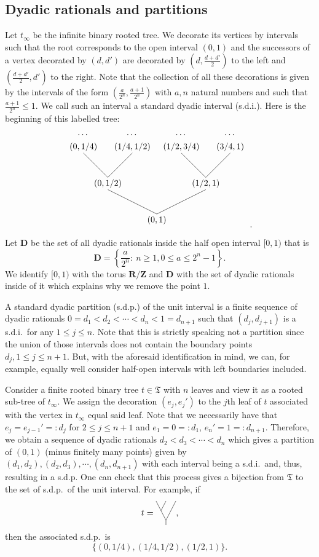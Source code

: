 \documentclass[a4paper,12pt]{amsart}
\numberwithin{equation}{section}
\theoremstyle{definition}
\newcommand{\D}{\mathbf D}
\newcommand{\R}{\mathbf{R}}
\newcommand{\fT}{\mathfrak T}
\newcommand{\Z}{\mathbf{Z}}
\begin{document}
\subsection{Dyadic rationals and partitions}\label{sec:Dyadic}
Let $t_\infty$ be the infinite binary rooted tree.
We decorate its vertices by intervals such that the root corresponds to the open interval $(0,1)$ and the successors of a vertex decorated by $(d,d')$ are decorated by $(d,\tfrac{d+d'}{2})$ to the left and $(\tfrac{d+d'}{2} , d' )$ to the right.
Note that the collection of all these decorations is given by the intervals of the form $(\tfrac{a}{2^n}, \tfrac{a+1}{2^n})$ with $a,n$ natural numbers and such that $\tfrac{a+1}{2^n}\leq 1.$
We call such an interval a standard dyadic interval (s.d.i.).
\newcommand{\tinf}{
\begin{tikzpicture}
\node at (0,-.25) {$(0,1)$};
\draw (0,0)--(-2,1);
\draw (0,0)--(2,1);
\node at (-2,1.25) {$(0,1/2)$};
\draw (-2,1.5)--(-3,2.5);
\draw (-2,1.5)--(-1,2.5);
\node at (2,1.25) {$(1/2,1)$};
\draw (2,1.5)--(1,2.5);
\draw (2,1.5)--(3,2.5);
\node at (-3,2.75) {$(0,1/4)$};
\node at (-1,2.75) {$(1/4,1/2)$};
\node at (1,2.75) {$(1/2,3/4)$};
\node at (3,2.75) {$(3/4,1)$};
\node at (-3,3.25) {$\cdots$};
\node at (-1,3.25) {$\cdots$};
\node at (1,3.25) {$\cdots$};
\node at (3,3.25) {$\cdots$};
\end{tikzpicture}
}
{Here is the beginning of this labelled tree:
$$\tinf\ .$$}
Let $\D$ be the set of all dyadic rationals inside the half open interval $[0,1)$ that is $$\D=\left\{ \dfrac{a}{2^n} :\ n\geq 1, 0\leq a\leq 2^n-1 \right\}.$$
We identify $[0,1)$ with the torus $\R/\Z$ and $\D$ with the set of dyadic rationals inside of it which explains why we remove the point $1$.

A standard dyadic partition (s.d.p.) of the unit interval is a finite sequence of dyadic rationals $0=d_1< d_2<\cdots<d_{n} <1=d_{n+1}$ such that 
$(d_j,d_{j+1})$ is a s.d.i.~for any $1\leq j\leq n.$
Note that this is strictly speaking not a partition since the union of those intervals does not contain the boundary points $d_j, 1\leq j\leq n+1$. 
But, with the aforesaid identification in mind, we can, for example, equally well consider half-open intervals with left boundaries included.

Consider a finite rooted binary tree $t\in\fT$ with $n$ leaves and view it as a rooted sub-tree of $t_\infty.$
We assign the decoration $(e_j,e_j')$ to the $j$th leaf of $t$ associated with the vertex in $t_\infty$ equal said leaf.
Note that we necessarily have that $e_j = e_{j-1}'=:d_j$ for $2\leq j\leq n+1$ and $e_1=0=:d_1$, $e_n'=1 =: d_{n+1}.$
Therefore, we obtain a sequence of dyadic rationals $d_2 < d_3 < \cdots < d_{n}$ which gives a partition of $(0,1)$ (minus finitely many points) given by $(d_1,d_2), (d_2, d_3),\cdots, (d_{n},d_{n+1})$ with each interval being a s.d.i.~and, thus, resulting in a s.d.p.
One can check that this process gives a bijection from $\fT$ to the set of s.d.p.~of the unit interval.
{For example, if 
$$t=\funfun,$$ 
then the associated s.d.p.~is 
$$\{ (0,1/4), (1/4,1/2), (1/2,1)\}.$$}
\end{document}
